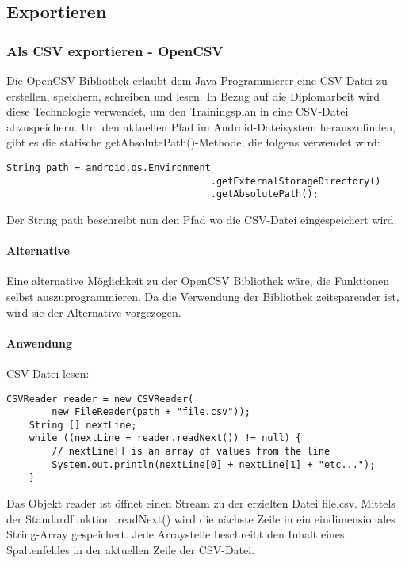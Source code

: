 \documentclass[FIPLY_base.tex]{subfiles}
\begin{document}
\subsection{Exportieren}
\subsubsection{Als CSV exportieren - OpenCSV}
Die OpenCSV Bibliothek erlaubt dem Java Programmierer eine CSV Datei zu erstellen, speichern, schreiben und lesen.
In Bezug auf die Diplomarbeit wird diese Technologie verwendet, um den Trainingsplan in eine CSV-Datei abzuspeichern.
Um den aktuellen Pfad im Android-Dateisystem herauszufinden, gibt es die statische getAbsolutePath()-Methode, die folgens verwendet wird:
\begin{lstlisting}[caption={Methode, um den aktuellen Pfad herauszufinden.},label=DescriptiveLabel]
	String path = android.os.Environment
									.getExternalStorageDirectory()
									.getAbsolutePath();
\end{lstlisting}
Der String \grqq{}path\grqq{} beschreibt nun den Pfad wo die CSV-Datei eingespeichert wird.

\paragraph{Alternative}
Eine alternative Möglichkeit zu der OpenCSV Bibliothek wäre, die Funktionen selbst auszuprogrammieren. Da die Verwendung der Bibliothek zeitsparender ist, wird sie der Alternative vorgezogen.
\paragraph{Anwendung}
CSV-Datei lesen:
\begin{lstlisting}[caption={Verwendung von CSVReader: Möglichkeit 1, iterativ},label=DescriptiveLabel]
	CSVReader reader = new CSVReader(
		new FileReader(path + "file.csv"));
	String [] nextLine;
	while ((nextLine = reader.readNext()) != null) {
		// nextLine[] is an array of values from the line
		System.out.println(nextLine[0] + nextLine[1] + "etc...");
	}

\end{lstlisting}

Das Objekt reader ist öffnet einen Stream zu der erzielten Datei \grqq{}file.csv\grqq{}. Mittels der Standardfunktion .readNext() wird die nächste Zeile in ein eindimensionales String-Array gespeichert. Jede Arraystelle beschreibt den Inhalt eines Spaltenfeldes in der aktuellen Zeile der CSV-Datei.
\end{document}
